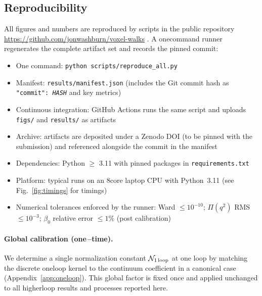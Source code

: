 \documentclass[11pt,a4paper]{article}
\theoremstyle{definition}
\theoremstyle{remark}
\begin{document}
\subsection{Reproducibility}
All figures and numbers are reproduced by scripts in the public repository \url{https://github.com/jonwashburn/voxel-walks} \cite{voxelwalksRepo}. A one\-command runner regenerates the complete artifact set and records the pinned commit:
\begin{itemize}
  \item One command: \texttt{python\ scripts/reproduce\_all.py}
  \item Manifest: \texttt{results/manifest.json} (includes the Git commit hash as \texttt{"commit":\,\textit{HASH}} and key metrics)
  \item Continuous integration: GitHub Actions runs the same script and uploads \texttt{figs/} and \texttt{results/} as artifacts
  \item Archive: artifacts are deposited under a Zenodo DOI (to be pinned with the submission) and referenced alongside the commit in the manifest \cite{washburn2025constants}
  \item Dependencies: Python $\ge$ 3.11 with pinned packages in \texttt{requirements.txt}
  \item Platform: typical runs on an 8\-core laptop CPU with Python~3.11 (see Fig.~\ref{fig:timings} for timings)
  \item Numerical tolerances enforced by the runner: Ward $\le 10^{-10}$; $\Pi(q^2)$ RMS $\le 10^{-3}$; $\beta_0$ relative error $\le 1\%$ (post calibration)
\end{itemize}

\paragraph{Global calibration (one\,\mbox{--}time).}
We determine a single normalization constant $\mathcal N_{\text{1\,loop}}$ at one loop by matching the discrete one\-loop kernel to the continuum coefficient in a canonical case (Appendix~\ref{app:oneloop}). This global factor is fixed once and applied unchanged to all higher\-loop results and processes reported here.
\end{document}
